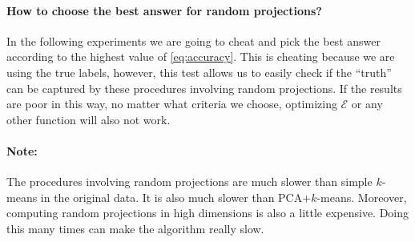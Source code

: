 \documentclass[aps,preprint,nofootinbib,floatfix]{revtex4-1}
\begin{document}
\paragraph*{How to choose the best answer for random projections?}
In the following experiments we are going to cheat and pick the best answer
according to the highest value of \eqref{eq:accuracy}. This is cheating because
we are using the true labels, however, this test allows us to easily
check if the ``truth'' can be captured by these procedures involving
random projections. If the results
are poor in this way, no matter what criteria we choose, optimizing 
$\mathcal{E}$ or any other function will also not work.

\paragraph*{Note:} The procedures involving random projections are much
slower than simple $k$-means in the original data. It is also much slower
than PCA$+$$k$-means. Moreover, computing random projections in high
dimensions is also a little expensive. Doing this many times can make
the algorithm really slow.

%
%
%
%
\end{document}
